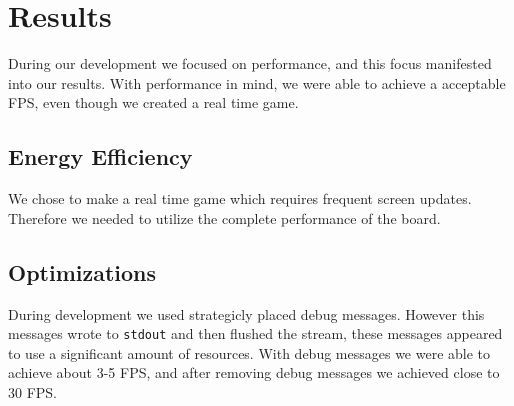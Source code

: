 \chapter{Results}
During our development we focused on performance, and this focus manifested into our results. With performance in mind, we were able to achieve a acceptable FPS, even though we created a real time game.

\section{Energy Efficiency}
We chose to make a real time game which requires frequent screen updates. Therefore we needed to utilize the complete performance of the board. 

\section{Optimizations}
During development we used strategicly placed debug messages. However this messages wrote to \texttt{stdout} and then flushed the stream, these messages appeared to use a significant amount of resources. With debug messages we were able to achieve about 3-5 FPS, and after removing debug messages we achieved close to 30 FPS.